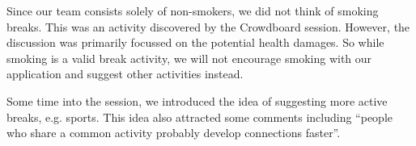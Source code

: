 Since our team consists solely of non-smokers, we did not think of smoking breaks. This was an activity discovered by the Crowdboard session. However, the discussion was primarily focussed on the potential health damages. So while smoking is a valid break activity, we will not encourage smoking with our application and suggest other activities instead.

Some time into the session, we introduced the idea of suggesting more active breaks, e.g. sports. This idea also attracted some comments including ``people who share a common activity probably develop
connections faster''.

